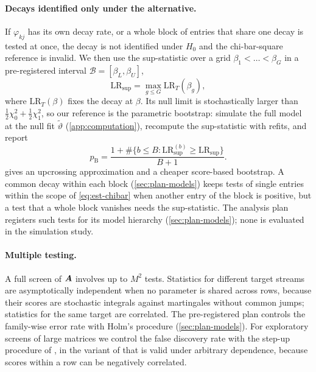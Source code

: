 \paragraph{Decays identified only under the alternative.} If $\varphi_{kj}$ has its own
decay rate, or a whole block of entries that share one decay is tested at once, the decay
is not identified under $H_0$ and the chi-bar-square reference is invalid. We then use the
sup-statistic over a grid $\beta_1<\dots<\beta_G$ in a pre-registered interval
$\mathcal B=[\beta_L,\beta_U]$,
\begin{equation}\label{eq:est-suplr}
  \mathrm{LR}_{\sup}=\max_{g\le G}\mathrm{LR}_T(\beta_g),
\end{equation}
where $\mathrm{LR}_T(\beta)$ fixes the decay at $\beta$. Its null limit
\citep{davies1977,davies1987} is stochastically larger than
$\tfrac12\chi^2_0+\tfrac12\chi^2_1$, so our reference is the parametric bootstrap: simulate
the full model at the null fit $\tilde\vartheta$ (\cref{app:computation}), recompute the
sup-statistic with refits, and report
\begin{equation}\label{eq:est-pboot}
  p_{\mathrm B}=\frac{1+\#\{b\le B:\mathrm{LR}^{(b)}_{\sup}\ge\mathrm{LR}_{\sup}\}}{B+1}.
\end{equation}
 gives an upcrossing approximation and a cheaper score-based
bootstrap. A common decay within each block (\cref{sec:plan-models}) keeps tests of single
entries within the scope of \eqref{eq:est-chibar} when another entry of the block is
positive, but a test that a whole block vanishes needs the sup-statistic. The analysis plan
registers such tests for its model hierarchy (\cref{sec:plan-models}); none is evaluated in
the simulation study.

\paragraph{Multiple testing.} A full screen of $\bm{A}$ involves up to $M^2$ tests.
Statistics for different target streams are asymptotically independent when no parameter
is shared across rows, because their scores are stochastic integrals against martingales
without common jumps; statistics for the same target are correlated. The pre-registered
plan controls the family-wise error rate with Holm's procedure \citep{holm1979}
(\cref{sec:plan-models}). For exploratory screens of large matrices we control the false
discovery rate with the step-up procedure of \citet{benjamini1995}, in the variant of
\citet{benjamini2001} that is valid under arbitrary dependence, because scores within a row
can be negatively correlated.

